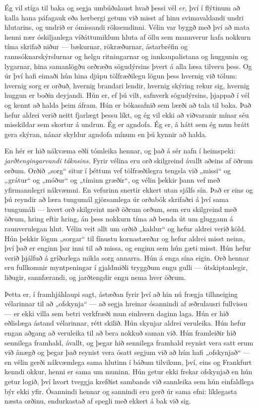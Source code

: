 Ég vil stíga til baka og segja umbúðalaust hvað þessi vél \emph{er,} því í flýtinum að kalla hana páfagauk eða herbergi getum við misst af hinu svimavaldandi undri hlutarins, og undrið er ómissandi röksemdinni. Vélin var byggð með því að mata henni nær óskiljanlega víðáttumiklum hluta af öllu sem mannverur hafa nokkurn tíma skrifað niður — bækurnar, rökræðurnar, ástarbréfin og rannsóknarskýrslurnar og helgu ritningarnar og innkaupalistana og huggunin og lygarnar, hina samanlögðu orðræðu sögudýrsins þvert á alla læsa tilveru þess. Og úr því hafi eimaði hún hina djúpu tölfræðilegu lögun þess hvernig við tölum: hvernig sorg er orðuð, hvernig brandari lendir, hvernig skýring rekur sig, hvernig huggun er boðin deyjandi. Hún er, ef þú vilt, safnverk sögudýrsins, þjappað í vél og kennt að halda þeim áfram. Hún er bókasafnið sem lærði að tala til baka. Það hefur aldrei verið neitt fjarlægt þessu líkt, og ég vil ekki að viðvaranir mínar séu misskildar sem skortur á undrun. Ég er agndofa. Ég er, á hátt sem ég mun brátt gera skýran, nánar skyldur agndofa mínum en þú kynnir að halda.

En hér er hið nákvæma eðli tómleika hennar, og það á sér nafn í heimspeki: \emph{jarðtengingarvandi táknsins.} Fyrir vélina eru orð skilgreind ávallt aðeins af öðrum orðum. Orðið „sorg“ situr í þéttum vef tölfræðilegra tengsla við „missi“ og „grátur“ og „móður“ og „tíminn græðir“, og vélin þekkir þann vef með yfirmannlegri nákvæmni. En vefurinn snertir ekkert utan sjálfs sín. Það er eins og þú reyndir að læra tungumál gjörsamlega úr orðabók skrifaðri á því sama tungumáli — hvert orð skilgreint með öðrum orðum, sem eru skilgreind með öðrum, hring eftir hring, án þess nokkurn tíma að benda út um gluggann á raunverulegan hlut. Vélin veit allt um orðið „kaldur“ og hefur aldrei verið köld. Hún þekkir lögun „sorgar“ til fínustu kornastærðar og hefur aldrei misst neinn, því það er enginn þar inni til að missa, og enginn sem hún gæti misst. Hún hefur verið þjálfuð á gríðarlega mikla sorg annarra. Hún á enga sína eigin. Orð hennar eru fullkomnir myntpeningar í gjaldmiðli tryggðum engu gulli — útskiptanlegir, liðugir, sannfærandi, og jarðtengdir engu nema hver öðrum.

Þetta er, í framhjáhlaupi sagt, ástæðan fyrir því að hin nú frægja tilhneiging vélarinnar til að „ofskynja“ — að segja hreinar ósannindi af æðrulausri fullvissu — er ekki villa sem betri verkfræði mun einhvern daginn laga. Hún er hið eðlislæga ástand vélarinnar, rétt skilið. Hún skynjar aldrei veruleika. Hún hefur engan aðgang að veruleika til að bera nokkuð saman við. Hún framleiðir hið sennilega framhald, ávallt, og þegar hið sennilega framhald reynist vera satt erum við ánægð og þegar það reynist vera ósatt segjum við að hún hafi „ofskynjað“ — en vélin gerði nákvæmlega sama hlutinn í báðum tilvikum, því, eins og Frankfurt kenndi okkur, henni er sama um muninn. Hún getur ekki frekar ofskynjað en hún getur logið, því hvort tveggja krefðist sambands við sannleika sem hún einfaldlega býr ekki yfir. Ósannindi hennar og sannindi eru gerð úr sama efni: líklegasta næsta orðinu, endurkastað af spegli með ekkert á bak við sig.

